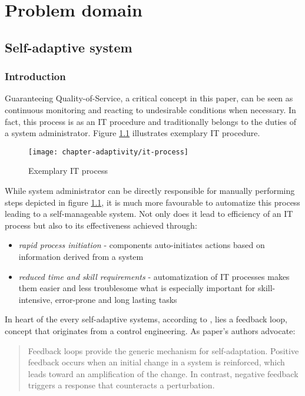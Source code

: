 \chapter{Problem domain}

\section{Self-adaptive system}

\subsection{Introduction}
Guaranteeing Quality-of-Service, a critical concept in this paper, can be seen as continuous monitoring and reacting to undesirable conditions when necessary. In fact, this process is as an IT procedure and traditionally belongs to the duties of a system administrator. Figure \ref{fig:it-process} illustrates exemplary IT procedure.

\begin{figure}[!ht]
  \begin{center}
    \texttt{[image: chapter-adaptivity/it-process]}
  \end{center}
  \caption{Exemplary IT process}
  \label{fig:it-process}
\end{figure}

While system administrator can be directly responsible for manually performing steps depicted in figure \ref{fig:it-process}, it is much more favourable to automatize this process leading to a self-manageable system. Not only does it lead to efficiency of an IT process but also to its effectiveness \cite{IBM06} achieved through:
\begin{itemize}
  \item \emph{rapid process initiation} - components auto-initiates actions based on information derived from a system
  \item \emph{reduced time and skill requirements} - automatization of IT processes makes them easier and less troublesome what is especially important for skill-intensive, error-prone and long lasting tasks
\end{itemize}

In heart of the every self-adaptive systems, according to \cite{brun2009engineering}, lies a feedback loop, concept that originates from a control engineering. As paper's authors advocate:
\begin{quote}
Feedback loops provide the generic mechanism for self-adaptation. Positive feedback occurs when an initial change in a system is reinforced, which leads toward an amplification of the change. In contrast, negative feedback triggers a response that counteracts a perturbation. 
\end{quote}

